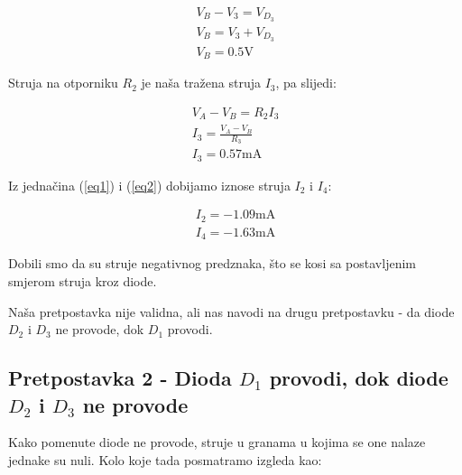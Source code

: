 \documentclass{article}
\begin{document}
        \begin{equation}
            \begin{split}
                V_B - V_3 = V_{D_3} \\
                V_B = V_3 + V_{D_3} \\
                V_B = 0.5 \si{\volt}
            \end{split}
            \label{eq6}
        \end{equation}

        Struja na otporniku $R_2$ je naša tražena struja $I_3$, pa slijedi:

        \begin{equation}
            \begin{split}
                V_A - V_B = R_2I_3 \\
                I_3 = \frac{V_A - V_B}{R_3} \\
                I_3 = 0.57 \si{\mA}
            \end{split}
        \end{equation}

        Iz jednačina (\ref{eq1}) i (\ref{eq2}) dobijamo iznose struja $I_2$ i $I_4$:

        \begin{align} 
            I_2 = -1.09 \si{\mA} \label{eq7} \\ 
            I_4 = -1.63 \si{\mA} \label{eq8}
        \end{align}

        Dobili smo da su struje negativnog predznaka, što se kosi sa postavljenim smjerom struja kroz diode.

        Naša pretpostavka nije validna, ali nas navodi na drugu pretpostavku - da diode $D_2$ i $D_3$ ne provode, dok $D_1$ provodi.

        \newpage

    \subsection{Pretpostavka 2 - Dioda $D_1$ provodi, dok diode $D_2$ i $D_3$ ne provode}

        Kako pomenute diode ne provode, struje u granama u kojima se one nalaze jednake su nuli. 
        Kolo koje tada posmatramo izgleda kao:
        
\end{document}
